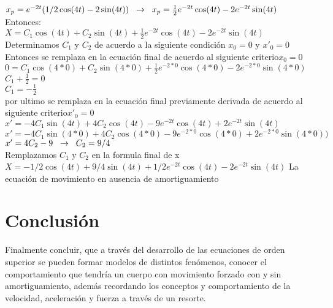 \documentclass[12pt,a4paper]{article}
\begin{document}
$x_{p}=e^{-2t}(1/2\cos(4t)-2\sin(4t))\hspace{0.2cm}\rightarrow\hspace{0.2cm}x_{p}=\frac{1}{2}e^{-2t}\cos(4t)-2e^{-2t}\sin(4t)$ Entonces:\\

$X=C_{1}\cos(4 t)+C_{2}\sin(4 t)+\frac{1}{2}e^{-2t}\cos(4t)-2e^{-2t}\sin(4t)$\hspace{0.2cm}Determinamos $C_1$ y $C_2$ de acuerdo a la siguiente condición $x_{0}=0$ y $x'_{0}=0$\\

Entonces se remplaza en la ecuación final de acuerdo al siguiente criterio$x_{0}=0$\\

$0=C_{1}\cos(4 *0)+C_{2}\sin(4 *0)+\frac{1}{2}e^{-2*0}\cos(4*0)-2e^{-2*0}\sin(4*0)$\\

$C_{1}+\frac{1}{2}=0$\\

$C_{1}=-\frac{1}{2}$\\

por ultimo se remplaza en la ecuación final previamente derivada de acuerdo al siguiente criterio$x'_{0}=0$  \\

$x'=-4C_1\sin(4t)+4C_2\cos (4t)-9e^{-2t}\cos (4t)+2e^{-2t}\sin (4t)$\\

$x'=-4C_1\sin(4*0)+4C_2\cos (4*0)-9e^{-2*0}\cos (4*0)+2e^{-2*0}\sin (4*0))$\\

$x'=4C_2-9\hspace{0.2cm}\rightarrow\hspace{0.2cm}C_2=9/4$\\Remplazamos $C_1$ y $C_2$ en la formula final de x\\

$X=-1/2\cos(4 t)+9/4\sin(4 t)+1/2e^{-2t}\cos(4t)-2e^{-2t}\sin(4t)$\hspace{0.2cm} La ecuación de 
movimiento en ausencia de amortiguamiento

	\section{Conclusión}

Finalmente concluir, que a través del desarrollo de las ecuaciones de orden superior se pueden formar modelos de distintos fenómenos, conocer el comportamiento que tendría un cuerpo con movimiento forzado con y sin amortiguamiento, además recordando los conceptos y comportamiento de la velocidad, aceleración y fuerza a través de un resorte. 
\end{document}
